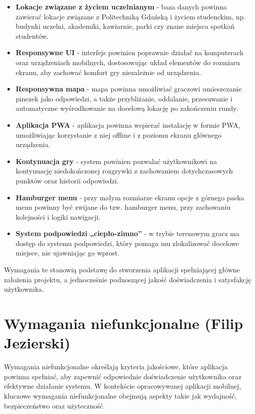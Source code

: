 \begin{itemize}
    \item \textbf{Lokacje związane z życiem uczelnianym} - baza danych powinna zawierać lokacje związane z Politechniką Gdańską i życiem studenckim, np. budynki uczelni, akademiki, kawiarnie, parki czy znane miejsca spotkań studentów.
    \item \textbf{Responsywne UI} - interfejs powinien poprawnie działać na komputerach oraz urządzeniach mobilnych, dostosowując układ elementów do rozmiaru ekranu, aby zachować komfort gry niezależnie od urządzenia.
    \item \textbf{Responsywna mapa} - mapa powinna umożliwiać graczowi umieszczanie pinezek jako odpowiedzi, a także przybliżanie, oddalanie, przesuwanie i automatyczne wyśrodkowanie na docelową lokację po zakończeniu rundy.
    \item \textbf{Aplikacja PWA} - aplikacja powinna wspierać instalację w formie PWA, umożliwiając korzystanie z niej offline i z poziomu ekranu głównego urządzenia.
    \item \textbf{Kontynuacja gry} - system powinien pozwalać użytkownikowi na kontynuację niedokończonej rozgrywki z zachowaniem dotychczasowych punktów oraz historii odpowiedzi.
    \item \textbf{Hamburger menu} - przy małym rozmiarze ekranu opcje z górnego paska menu powinny być zwijane do tzw. hamburger menu, przy zachowaniu kolejności i logiki nawigacji.
    \item \textbf{System podpowiedzi „ciepło-zimno”} - w trybie terenowym gracz ma dostęp do systemu podpowiedzi, który pomaga mu zlokalizować docelowe miejsce, nie ujawniając go wprost.
\end{itemize}

Wymagania te stanowią podstawę do stworzenia aplikacji spełniającej główne założenia projektu, a jednocześnie podnoszącej jakość doświadczenia i satysfakcję użytkownika.


\section{Wymagania niefunkcjonalne (Filip Jezierski)}
Wymagania niefunkcjonalne określają kryteria jakościowe, które aplikacja powinna spełniać, aby zapewnić odpowiednie doświadczenie użytkownika oraz efektywne działanie systemu. W kontekście opracowywanej aplikacji mobilnej, kluczowe wymagania niefunkcjonalne obejmują aspekty takie jak wydajność, bezpieczeństwo oraz użyteczność.

